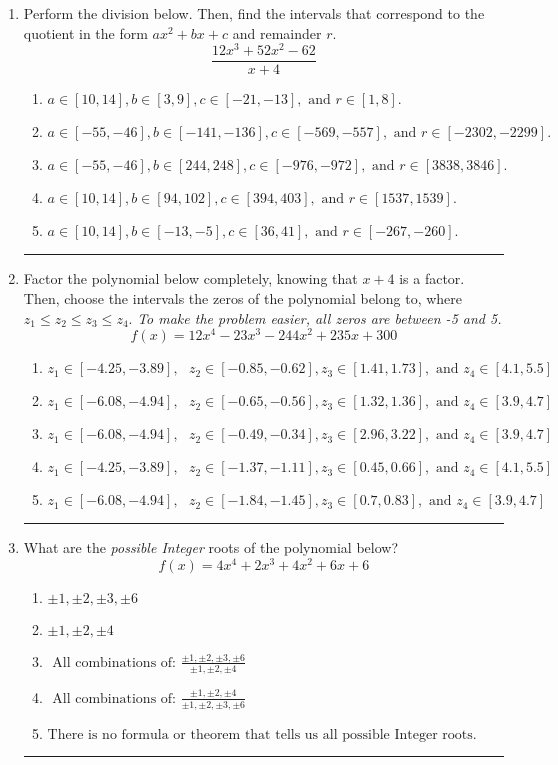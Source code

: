 \documentclass[14pt]{extbook}
\newcommand{\litem}[1]{\item#1\hspace*{-1cm}\rule{\textwidth}{0.4pt}}
\begin{document}
\begin{enumerate}
{\begin{enumerate}[label=\Alph*.]
\end{enumerate} }
\litem{
Perform the division below. Then, find the intervals that correspond to the quotient in the form $ax^2+bx+c$ and remainder $r$.\[ \frac{12x^{3} +52 x^{2} -62}{x + 4} \]\begin{enumerate}[label=\Alph*.]
\item \( a \in [10, 14], b \in [3, 9], c \in [-21, -13], \text{ and } r \in [1, 8]. \)
\item \( a \in [-55, -46], b \in [-141, -136], c \in [-569, -557], \text{ and } r \in [-2302, -2299]. \)
\item \( a \in [-55, -46], b \in [244, 248], c \in [-976, -972], \text{ and } r \in [3838, 3846]. \)
\item \( a \in [10, 14], b \in [94, 102], c \in [394, 403], \text{ and } r \in [1537, 1539]. \)
\item \( a \in [10, 14], b \in [-13, -5], c \in [36, 41], \text{ and } r \in [-267, -260]. \)

\end{enumerate} }
\litem{
Factor the polynomial below completely, knowing that $x + 4$ is a factor. Then, choose the intervals the zeros of the polynomial belong to, where $z_1 \leq z_2 \leq z_3 \leq z_4$. \textit{To make the problem easier, all zeros are between -5 and 5.}\[ f(x) = 12x^{4} -23 x^{3} -244 x^{2} +235 x + 300 \]\begin{enumerate}[label=\Alph*.]
\item \( z_1 \in [-4.25, -3.89], \text{   }  z_2 \in [-0.85, -0.62], z_3 \in [1.41, 1.73], \text{   and   } z_4 \in [4.1, 5.5] \)
\item \( z_1 \in [-6.08, -4.94], \text{   }  z_2 \in [-0.65, -0.56], z_3 \in [1.32, 1.36], \text{   and   } z_4 \in [3.9, 4.7] \)
\item \( z_1 \in [-6.08, -4.94], \text{   }  z_2 \in [-0.49, -0.34], z_3 \in [2.96, 3.22], \text{   and   } z_4 \in [3.9, 4.7] \)
\item \( z_1 \in [-4.25, -3.89], \text{   }  z_2 \in [-1.37, -1.11], z_3 \in [0.45, 0.66], \text{   and   } z_4 \in [4.1, 5.5] \)
\item \( z_1 \in [-6.08, -4.94], \text{   }  z_2 \in [-1.84, -1.45], z_3 \in [0.7, 0.83], \text{   and   } z_4 \in [3.9, 4.7] \)

\end{enumerate} }
\litem{
What are the \textit{possible Integer} roots of the polynomial below?\[ f(x) = 4x^{4} +2 x^{3} +4 x^{2} +6 x + 6 \]\begin{enumerate}[label=\Alph*.]
\item \( \pm 1,\pm 2,\pm 3,\pm 6 \)
\item \( \pm 1,\pm 2,\pm 4 \)
\item \( \text{ All combinations of: }\frac{\pm 1,\pm 2,\pm 3,\pm 6}{\pm 1,\pm 2,\pm 4} \)
\item \( \text{ All combinations of: }\frac{\pm 1,\pm 2,\pm 4}{\pm 1,\pm 2,\pm 3,\pm 6} \)
\item \( \text{There is no formula or theorem that tells us all possible Integer roots.} \)

\end{enumerate} }
\end{enumerate}
\end{document}
